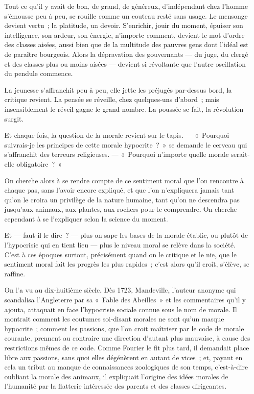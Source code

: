 \documentclass[french,twoside]{book} %
\begin{document}
Tout ce qu’il y avait de bon, de grand, de généreux, d’indépendant chez l’homme s’émousse peu à peu, se rouille comme un couteau resté sans usage. Le mensonge devient vertu ; la platitude, un devoir. S’enrichir, jouir du moment, épuiser son intelligence, son ardeur, son énergie, n’importe comment, devient le mot d’ordre des classes aisées, aussi bien que de la multitude des pauvres gens dont l’idéal est de paraître bourgeois. Alors la dépravation des gouvernants — du juge, du clergé et des classes plus ou moins aisées — devient si révoltante que l’autre oscillation du pendule commence.\par
La jeunesse s’affranchit peu à peu, elle jette les préjugés par-dessus bord, la critique revient. La pensée se réveille, chez quelques-uns d’abord ; mais insensiblement le réveil gagne le grand nombre. La poussée se fait, la révolution surgit.\par
\bigbreak
\noindent Et chaque fois, la question de la morale revient sur le tapis. — « Pourquoi suivrais-je les principes de cette morale hypocrite ? » se demande le cerveau qui s’affranchit des terreurs religieuses. — « Pourquoi n’importe quelle morale serait-elle obligatoire ? »\par
On cherche alors à se rendre compte de ce sentiment moral que l’on rencontre à chaque pas, sans l’avoir encore expliqué, et que l’on n’expliquera jamais tant qu’on le croira un privilège de la nature humaine, tant qu’on ne descendra pas jusqu’aux animaux, aux plantes, aux rochers pour le comprendre. On cherche cependant à se l’expliquer selon la science du moment.\par
Et — faut-il le dire ? — plus on sape les bases de la morale établie, ou plutôt de l’hypocrisie qui en tient lieu — plus le niveau moral se relève dans la société. C’est à ces époques surtout, précisément quand on le critique et le nie, que le sentiment moral fait les progrès les plus rapides ; c’est alors qu’il croît, s’élève, se raffine.\par
\bigbreak
\noindent On l’a vu au dix-huitième siècle. Dès 1723, Mandeville, l’auteur anonyme qui scandalisa l’Angleterre par sa « Fable des Abeilles » et les commentaires qu’il y ajouta, attaquait en face l’hypocrisie sociale connue sous le nom de morale. Il montrait comment les coutumes soi-disant morales ne sont qu’un masque hypocrite ; comment les passions, que l’on croit maîtriser par le code de morale courante, prennent au contraire une direction d’autant plus mauvaise, à cause des restrictions mêmes de ce code. Comme Fourier le fit plus tard, il demandait place libre aux passions, sans quoi elles dégénèrent en autant de vices ; et, payant en cela un tribut au manque de connaissances zoologiques de son temps, c’est-à-dire oubliant la morale des animaux, il expliquait l’origine des idées morales de l’humanité par la flatterie intéressée des parents et des classes dirigeantes.\par
\end{document}
